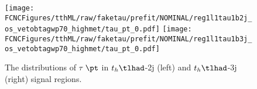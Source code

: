 \begin{figure}[H]
\centering
\texttt{[image: \\FCNCFigures/tthML/raw/faketau/prefit/NOMINAL/reg1l1tau1b2j\_os\_vetobtagwp70\_highmet/tau\_pt\_0.pdf]}
\texttt{[image: \\FCNCFigures/tthML/raw/faketau/prefit/NOMINAL/reg1l1tau1b3j\_os\_vetobtagwp70\_highmet/tau\_pt\_0.pdf]}

\caption{ The distributions of $\tau$ $\pt$ in $t_h\tlhad$-2j (left) and $t_h\tlhad$-3j (right) signal regions. }
\label{fig:intro_pt_raw}
\end{figure}
